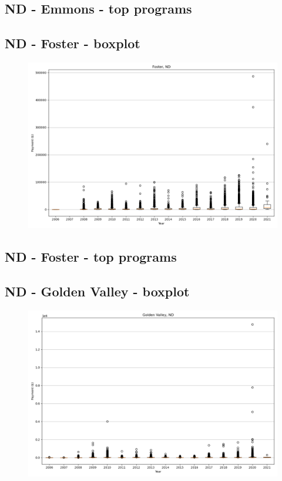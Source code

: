 \subsection*{ND - Emmons - top programs}

\newpage
\subsection*{ND - Foster - boxplot}
\begin{figure}[h]
\centering
\includegraphics[width=7in]{../output/boxplots/counties/Foster-ND_boxplot.png}
\end{figure}


\subsection*{ND - Foster - top programs}

\newpage
\subsection*{ND - Golden Valley - boxplot}
\begin{figure}[h]
\centering
\includegraphics[width=7in]{../output/boxplots/counties/Golden Valley-ND_boxplot.png}
\end{figure}


